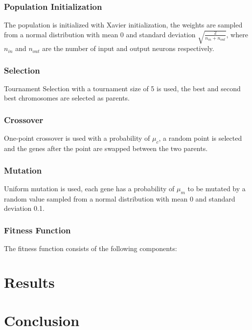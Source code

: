 \documentclass[sigconf]{acmart}
\begin{document}
\subsubsection{Population Initialization} The population is initialized with Xavier initialization, the weights are sampled from a normal distribution with mean 0 and standard deviation $\sqrt{\frac{2}{n_{in} + n_{out}}}$, where $n_{in}$ and $n_{out}$ are the number of input and output neurons respectively.
\subsubsection{Selection} Tournament Selection with a tournament size of 5 is used, the best and second best chromosomes are selected as parents.
\subsubsection{Crossover} One-point crossover is used with a probability of $\mu_c$, a random point is selected and the genes after the point are swapped between the two parents.
\subsubsection{Mutation} Uniform mutation is used, each gene has a probability of $\mu_m$ to be mutated by a random value sampled from a normal distribution with mean 0 and standard deviation 0.1.
\subsubsection{Fitness Function}
The fitness function consists of the following components:


\section{Results}

\section{Conclusion}



\end{document}

